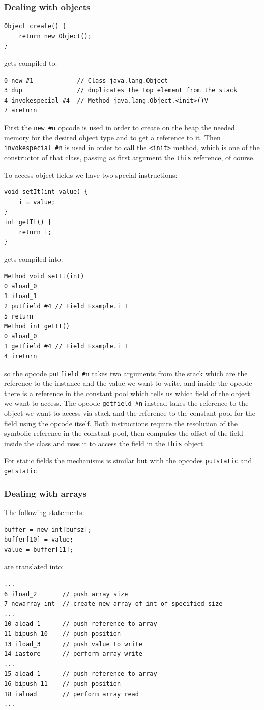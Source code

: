 \subsubsection{Dealing with objects}
\begin{verbatim}
Object create() {
    return new Object();
}
\end{verbatim}
gets compiled to:
\begin{verbatim}
0 new #1            // Class java.lang.Object
3 dup               // duplicates the top element from the stack
4 invokespecial #4  // Method java.lang.Object.<init>()V
7 areturn
\end{verbatim}
First the \verb|new #n| opcode is used in order to create on the heap the needed memory for the desired object type and to get a reference to it.
Then \verb|invokespecial #n| is used in order to call the \verb|<init>| method, which is one of the constructor of that class, passing as first argument the \verb|this| reference, of course.

To access object fields we have two special instructions:
\begin{verbatim}
void setIt(int value) {
    i = value;
}
int getIt() {
    return i;
}
\end{verbatim}
gets compiled into:
\begin{verbatim}
Method void setIt(int)
0 aload_0
1 iload_1
2 putfield #4 // Field Example.i I
5 return
Method int getIt()
0 aload_0
1 getfield #4 // Field Example.i I
4 ireturn
\end{verbatim}
so the opcode \verb|putfield #n| takes two arguments from the stack which are the reference to the instance and the value we want to write, and inside the opcode there is a reference in the constant pool which tells us which field of the object we want to access.
The opcode \verb|getfield #n| instead takes the reference to the object we want to access via stack and the reference to the constant pool for the field using the opcode itself.
Both instructions require the resolution of the symbolic reference in the constant pool, then computes the offset of the field inside the class and uses it to access the field in the \verb|this| object.

For static fields the mechanisms is similar but with the opcodes \verb|putstatic| and \verb|getstatic|.

\subsubsection{Dealing with arrays}
The following statements:
\begin{verbatim}
buffer = new int[bufsz];
buffer[10] = value;
value = buffer[11];
\end{verbatim}
are translated into:
\begin{verbatim}
...
6 iload_2       // push array size
7 newarray int  // create new array of int of specified size
...
10 aload_1      // push reference to array
11 bipush 10    // push position
13 iload_3      // push value to write
14 iastore      // perform array write
...
15 aload_1      // push reference to array
16 bipush 11    // push position
18 iaload       // perform array read
...
\end{verbatim}  

